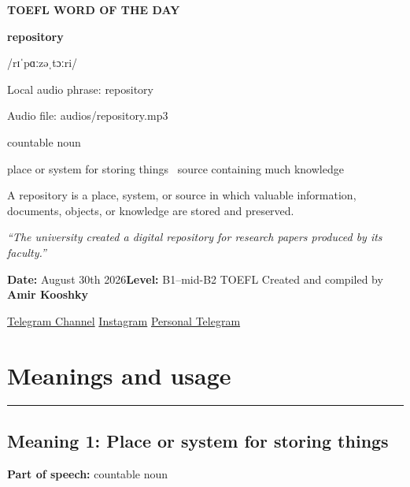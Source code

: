 \documentclass[11pt]{article}
\newcommand{\sectionrule}{\par\vspace{-0.5em}\noindent\textcolor{Accent}{\rule{\linewidth}{0.6pt}}\par}
\begin{document}
\begin{center}
{\sffamily\bfseries\color{Accent} TOEFL WORD OF THE DAY\par}
\vspace{8mm}
{\fontsize{42}{48}\selectfont\bfseries repository\par}
\vspace{2mm}
{\Large\sffamily\color{Accent} /rɪˈpɑːzəˌtɔːri/\par}
\vspace{2mm}
{\small\sffamily Local audio phrase: repository\par}
{\small\sffamily Audio file: audios/repository.mp3\par}
\vspace{2mm}
{\large\sffamily\color{Muted} countable noun\par}
\vspace{5mm}
{\sffamily place or system for storing things \textbullet\ source containing much knowledge\par}
\vspace{6mm}
{\large A repository is a place, system, or source in which valuable information, documents, objects, or knowledge are stored and preserved.\par}
\vspace{6mm}
\begin{minipage}{0.84\textwidth}
\itshape “The university created a digital repository for research papers produced by its faculty.”
\end{minipage}\par
\vspace{10mm}
\textbf{Date:} August 30th 2026\quad\textbullet\quad \textbf{Level:} B1--mid-B2 TOEFL
\vfill
Created and compiled by \textbf{Amir Kooshky}\par
\vspace{2mm}
\href{https://t.me/KooshkyTOEFL}{Telegram Channel}\quad\textbullet\quad
\href{https://www.instagram.com/kooshkytoefl}{Instagram}\quad\textbullet\quad
\href{https://t.me/KooshkyTOEFL\_pv}{Personal Telegram}
\end{center}
\newpage
\tableofcontents
\newpage

\section{Meanings and usage}
\sectionrule
\subsection{Meaning 1: Place or system for storing things}
\textbf{Part of speech:} countable noun
\end{document}
